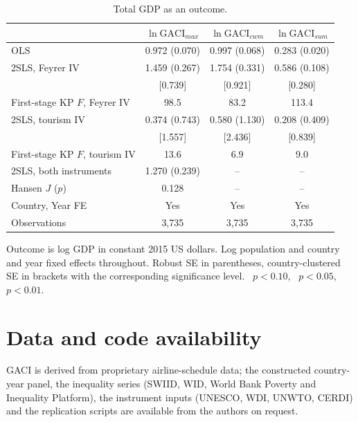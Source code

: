 \begin{table}[H]\centering\caption{Total GDP as an outcome.}\label{tab:a_growth_total}
\begin{threeparttable}\small\begin{tabular}{lccc}
\toprule
 & $\ln\mathrm{GACI}_{max}$ & $\ln\mathrm{GACI}_{cwm}$ & $\ln\mathrm{GACI}_{sum}$ \\
\midrule
OLS & 0.972\sym{***} (0.070) & 0.997\sym{***} (0.068) & 0.283\sym{***} (0.020) \\
2SLS, Feyrer IV & 1.459\sym{***} (0.267) & 1.754\sym{***} (0.331) & 0.586\sym{***} (0.108) \\
 & [0.739]\sym{**} & [0.921]\sym{*} & [0.280]\sym{**} \\
First-stage KP $F$, Feyrer IV & 98.5 & 83.2 & 113.4 \\
2SLS, tourism IV & 0.374 (0.743) & 0.580 (1.130) & 0.208 (0.409) \\
 & [1.557] & [2.436] & [0.839] \\
First-stage KP $F$, tourism IV & 13.6 & 6.9 & 9.0 \\
2SLS, both instruments & 1.270\sym{***} (0.239) & -- & -- \\
Hansen $J$ ($p$) & 0.128 & -- & -- \\
\midrule
Country, Year FE & Yes & Yes & Yes \\
Observations & 3,735 & 3,735 & 3,735 \\
\bottomrule
\end{tabular}
\begin{tablenotes}\footnotesize\item Outcome is log GDP in constant 2015 US dollars. Log population and country and year fixed effects throughout. Robust SE in parentheses, country-clustered SE in brackets with the corresponding significance level. \sym{*}~$p<0.10$, \sym{**}~$p<0.05$, \sym{***}~$p<0.01$.\end{tablenotes}\end{threeparttable}\end{table}

\section*{Data and code availability}
GACI is derived from proprietary airline-schedule data; the constructed country-year panel, the inequality series (SWIID, WID, World Bank Poverty and Inequality Platform), the instrument inputs (UNESCO, WDI, UNWTO, CERDI) and the replication scripts are available from the authors on request.





